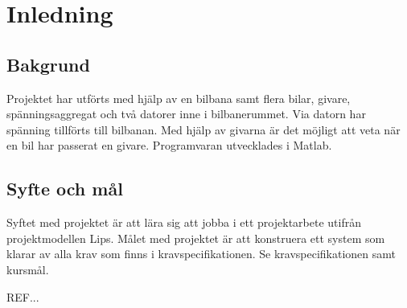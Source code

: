 \section{Inledning}

\subsection{Bakgrund} Projektet har utförts med hjälp av en bilbana samt
flera bilar, givare, spänningsaggregat och två datorer inne i bilbanerummet. Via datorn har spänning tillförts till bilbanan. Med hjälp av givarna är
det möjligt att veta när en bil har passerat en givare.  Programvaran utvecklades
i Matlab.

\subsection{Syfte och mål}

Syftet med projektet är att lära sig att jobba i ett projektarbete utifrån projektmodellen Lips. Målet med projektet är att konstruera ett system som klarar av alla krav som finns i kravspecifikationen. Se kravspecifikationen samt kursmål.

REF...